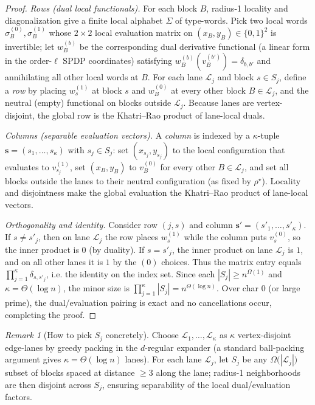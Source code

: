 \documentclass[12pt]{article}
\theoremstyle{definition}
\theoremstyle{definition}
\theoremstyle{remark}
\newtheorem{remark}{Remark}
\theoremstyle{remark}
\begin{document}
\begin{proof}
\emph{Rows (dual local functionals).} For each block $B$, radius-1 locality and diagonalization give a finite local alphabet $\Sigma$ of type-words. Pick two local words $\sigma_B^{(0)},\sigma_B^{(1)}$ whose $2\times 2$ local evaluation matrix on $(x_B,y_B)\in\{0,1\}^2$ is invertible; let $w_B^{(b)}$ be the corresponding dual derivative functional (a linear form in the order-$\ell$ SPDP coordinates) satisfying
$w_B^{(b)}(v_B^{(b')})=\delta_{b,b'}$ and annihilating all other local words at $B$.
For each lane $\mathcal{L}_j$ and block $s\in S_j$, define a \emph{row} by placing $w_{s}^{(1)}$ at block $s$
and $w_{B}^{(0)}$ at every other block $B\in \mathcal{L}_j$, and the neutral (empty) functional on blocks outside $\mathcal{L}_j$.
Because lanes are vertex-disjoint, the global row is the Khatri--Rao product of lane-local duals.

\emph{Columns (separable evaluation vectors).} A \emph{column} is indexed by a $\kappa$-tuple
$\mathbf{s}=(s_1,\dots,s_\kappa)$ with $s_j\in S_j$: set $(x_{s_j},y_{s_j})$ to the local configuration that evaluates to $v_{s_j}^{(1)}$, set $(x_{B},y_{B})$ to $v_{B}^{(0)}$ for every other $B\in \mathcal{L}_j$, and set all blocks outside the lanes to their neutral configuration (as fixed by $\rho^\star$). Locality and disjointness make the global evaluation the Khatri--Rao product of lane-local vectors.

\emph{Orthogonality and identity.} Consider row $(j,s)$ and column $\mathbf{s'}=(s'_1,\dots,s'_\kappa)$.
If $s\neq s'_j$, then on lane $\mathcal{L}_j$ the row places $w^{(1)}_s$ while the column puts $v^{(0)}_s$, so the inner product is $0$ (by duality). If $s=s'_j$, the inner product on lane $\mathcal{L}_j$ is $1$, and on all other lanes it is $1$ by the $(0)$ choices. Thus the matrix entry equals $\prod_{j=1}^\kappa \delta_{s,s'_j}$, i.e. the identity on the index set. Since each $|S_j|\ge n^{\Omega(1)}$ and $\kappa=\Theta(\log n)$, the minor size is
$\prod_{j=1}^\kappa |S_j| = n^{\Theta(\log n)}$. Over char $0$ (or large prime), the dual/evaluation pairing is exact and no cancellations occur, completing the proof.
\end{proof}

\begin{remark}[How to pick $S_j$ concretely]
Choose $\mathcal{L}_1,\dots,\mathcal{L}_\kappa$ as $\kappa$ vertex-disjoint edge-lanes by greedy packing in the $d$-regular expander (a standard ball-packing argument gives $\kappa=\Theta(\log n)$ lanes). For each lane $\mathcal{L}_j$, let $S_j$ be any $\Omega\!\big(|\mathcal{L}_j|\big)$ subset of blocks spaced at distance $\ge 3$ along the lane; radius-1 neighborhoods are then disjoint across $S_j$, ensuring separability of the local dual/evaluation factors.
\end{remark}
\end{document}
